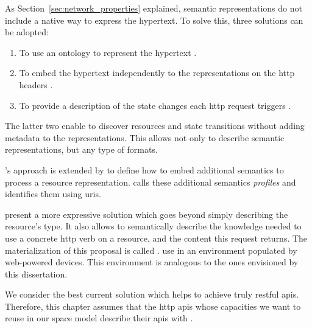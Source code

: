 As Section~\ref{sec:network_properties} explained, semantic representations do not include a native way to express the hypertext. %
To solve this, three solutions can be adopted:
\begin{enumerate}
  \item To use an ontology to represent the hypertext \citep{kjernsmo_necessity_2012}.
  \item To embed the hypertext independently to the representations on the \ac{http} headers \citep{mark_web_2010}.
  \item To provide a description of the state changes each \ac{http} request triggers \citep{verborgh_functional_2012,verborgh_ijcs_2014}.
\end{enumerate}


The latter two enable to discover resources and state transitions without adding metadata to the representations.
This allows not only to describe semantic representations, but any type of formats.


\citeauthor{mark_web_2010}'s \citep{mark_web_2010} approach is extended by \citet{erik_profile_2013} to define how to embed additional semantics to process a resource representation.
\citet{erik_profile_2013} calls these additional semantics \emph{profiles} and identifies them using \acsp{uri}.


\citet{verborgh_ijcs_2014} present a more expressive solution which goes beyond simply describing the resource's type.
It also allows to semantically describe the knowledge needed to use a concrete \acs{http} verb on a resource, and the content this request returns. %
The materialization of this proposal is called \restdesc{} \citep{verborgh_functional_2012}.
\citet{mayer_semantic_2013} use \restdesc{} in an environment populated by web-powered devices. %
This environment is analogous to the ones envisioned by this dissertation. %


\bigskip


We consider \restdesc{} the best current solution which helps to achieve truly \ac{rest}ful \acsp{api}.
Therefore, this chapter assumes that the \ac{http} \acsp{api} whose capacities we want to reuse in our space model describe their \acsp{api} with \restdesc{}.


\subsection{\restdesc{}}
\label{sec:restdesc}

